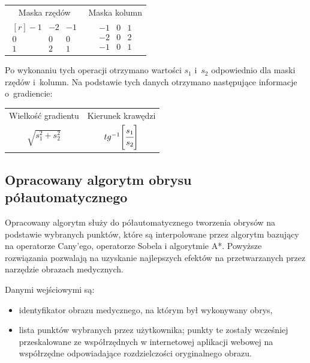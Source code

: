 \documentclass[a4paper,11pt,twoside,openright]{report}
\theoremstyle{definition}
\begin{document}
\begin{table}[h!]
\centering
\setlength{\tabcolsep}{40pt}
\begin{tabular} { c c }
  Maska rzędów & Maska kolumn \\
$
\begin{matrix*}[r]
-1 & -2 & -1 \\
0 & 0 & 0 \\
1 & 2 & 1
\end{matrix*}$
&
$\begin{matrix}
-1 & 0 & 1 \\
-2 & 0 & 2 \\
-1 & 0 & 1
\end{matrix}$
\end{tabular}
\end{table}

Po wykonaniu tych operacji otrzymano wartości $s_1$ i~$s_2$ odpowiednio dla maski
rzędów i~kolumn. Na podstawie tych danych otrzymano następujące informacje o~gradiencie:
\begin{table}[h!]
\centering
\setlength{\tabcolsep}{30pt}
\begin{tabular} { c c }
  Wielkość gradientu & Kierunek krawędzi \\
$\sqrt{s_1^2 + s_2^2}$ & $tg^{-1} \Bigg[ {\cfrac{s_1}{s_2}} \Bigg]$
\end{tabular}
\end{table}

\subsection {Opracowany algorytm obrysu półautomatycznego}

Opracowany algorytm służy do półautomatycznego tworzenia obrysów na podstawie wybranych punktów,
które są interpolowane przez algorytm bazujący na operatorze Cany'ego, operatorze Sobela i algorytmie A*.
Powyższe rozwiązania pozwalają na uzyskanie najlepszych efektów na przetwarzanych
przez narzędzie obrazach medycznych.

Danymi wejściowymi są:
\begin{itemize}[noitemsep]
\item {identyfikator obrazu medycznego, na którym był wykonywany obrys,}
\item {lista punktów wybranych przez użytkownika; punkty te zostały wcześniej
przeskalowane ze współrzędnych w internetowej aplikacji webowej
na współrzędne odpowiadające rozdzielczości oryginalnego obrazu.}
\end{itemize}
\end{document}
